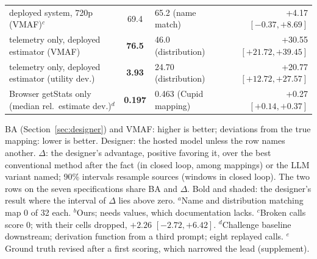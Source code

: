 \begin{table}[t]
\begin{threeparttable}
\begin{tabular}{@{}l c l r@{}}
\quad deployed system, 720p (VMAF)$^{c}$ & 69.4 & 65.2 (name match) & +4.17 $[-0.37, +8.69]$ \\
\quad telemetry only, deployed estimator (VMAF) & \cellcolor{favour}\bfseries 76.5 & 46.0 (distribution) & +30.55 $[+21.72, +39.45]$ \\
\quad telemetry only, deployed estimator (utility dev.) & \cellcolor{favour}\bfseries 3.93 & 24.70 (distribution) & +20.77 $[+12.72, +27.57]$ \\
Browser getStats only (median rel.\ estimate dev.)$^{d}$ & \cellcolor{favour}\bfseries 0.197 & 0.463 (Cupid mapping) & +0.27 $[+0.14, +0.37]$ \\
\bottomrule
\end{tabular}
\begin{tablenotes}\footnotesize
BA (Section~\ref{sec:designer}) and VMAF: higher is better; deviations from the true mapping: lower is better. Designer: the hosted model unless the row names another. $\Delta$: the designer's advantage, positive favoring it, over the best conventional method after the fact (in closed loop, among mappings) or the LLM variant named; 90\% intervals resample sources (windows in closed loop). The two rows on the seven specifications share BA and $\Delta$. Bold and shaded: the designer's result where the interval of $\Delta$ lies above zero. $^{a}$Name and distribution matching map 0 of 32 each. $^{b}$Ours; needs values, which documentation lacks. $^{c}$Broken calls score 0; with their cells dropped, $+2.26$ $[-2.72, +6.42]$. $^{d}$Challenge baseline downstream; derivation function from a third prompt; eight replayed calls. $^{e}$Ground truth revised after a first scoring, which narrowed the lead (supplement).
\end{tablenotes}
\end{threeparttable}
\end{table}